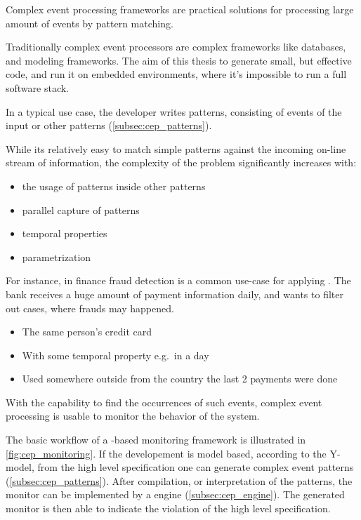 Complex event processing frameworks are practical solutions for processing large amount of events by pattern matching.

Traditionally complex event processors are complex frameworks like databases, and modeling frameworks. The aim of this thesis to generate small, but effective code, and run it on embedded environments, where it's impossible to run a full \cep{} software stack.

In a typical \cep{} use case, the developer writes patterns, consisting of events of the input or other patterns (\cref{subsec:cep_patterns}).

While its relatively easy to match simple patterns against the incoming on-line stream of information, the complexity of the problem significantly increases with:
\begin{itemize}
	\item the usage of patterns inside other patterns
	\item parallel capture of patterns
	\item temporal properties
	\item parametrization
\end{itemize}

For instance, in finance fraud detection is a common use-case for applying \cep{}. The bank receives a huge amount of payment information daily, and wants to filter out cases, where frauds may happened.
\begin{itemize}
	\item The same person's credit card
	\item With some temporal property e.g.\ in a day
	\item Used somewhere outside from the country the last 2 payments were done
\end{itemize}

With the capability to find the occurrences of such events, complex event processing is usable to monitor the behavior of the system.

The basic workflow of a \cep{}-based monitoring framework is illustrated in \cref{fig:cep_monitoring}. If the developement is model based, according to the Y-model, from the high level specification one can generate complex event patterns (\cref{subsec:cep_patterns}). After compilation, or interpretation of the patterns, the monitor can be implemented by a \cep{} engine (\cref{subsec:cep_engine}). The generated monitor is then able to indicate the violation of the high level specification.

